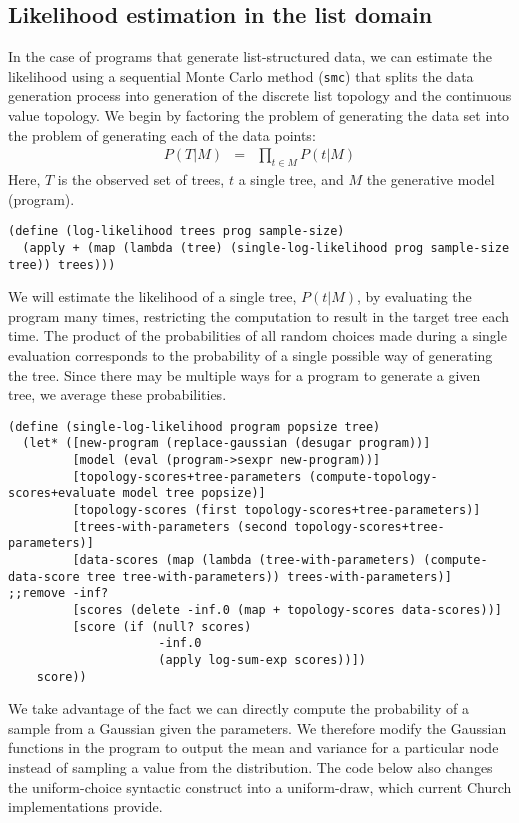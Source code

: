 \documentclass[a4paper,10pt]{article}
\begin{document}
\subsection{Likelihood estimation in the list domain}

In the case of programs that generate list-structured data, we can estimate the likelihood using a sequential Monte Carlo method (\texttt{smc}) that splits the data generation process into generation of the discrete list topology and the continuous value topology.
We begin by factoring the problem of generating the data set into the problem of generating each of the data points:
\begin{eqnarray}
P(T|M) &=& \prod_{t \in M}P(t|M)
\end{eqnarray}
Here, $T$ is the observed set of trees, $t$ a single tree, and $M$ the generative model (program).
\begin{lstlisting}[frame=trBL]
(define (log-likelihood trees prog sample-size)
  (apply + (map (lambda (tree) (single-log-likelihood prog sample-size tree)) trees)))
\end{lstlisting}
We will estimate the likelihood of a single tree, $P(t|M)$, by evaluating the program many times, restricting the computation to result in the target tree each time. The product of the probabilities of all random choices made during a single evaluation corresponds to the probability of a single possible way of generating the tree. Since there may be multiple ways for a program to generate a given tree, we average these probabilities.
\begin{lstlisting}[frame=trBL]
(define (single-log-likelihood program popsize tree)
  (let* ([new-program (replace-gaussian (desugar program))]
         [model (eval (program->sexpr new-program))]
         [topology-scores+tree-parameters (compute-topology-scores+evaluate model tree popsize)]
         [topology-scores (first topology-scores+tree-parameters)]
         [trees-with-parameters (second topology-scores+tree-parameters)]
         [data-scores (map (lambda (tree-with-parameters) (compute-data-score tree tree-with-parameters)) trees-with-parameters)] ;;remove -inf?
         [scores (delete -inf.0 (map + topology-scores data-scores))]
         [score (if (null? scores)
                     -inf.0
                     (apply log-sum-exp scores))])
    score))
\end{lstlisting}
We take advantage of the fact we can directly compute the probability of a sample from a Gaussian given the parameters.  We therefore modify the Gaussian functions in the program to output the mean and variance for a particular node instead of sampling a value from the distribution.  The code below also changes the uniform-choice syntactic construct into a uniform-draw, which current Church implementations provide.
\end{document}
